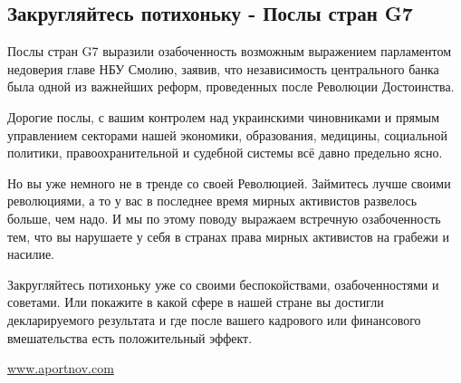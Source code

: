  
 
 
 
 
\subsection{Закругляйтесь потихоньку - Послы стран G7}

Послы стран G7 выразили озабоченность возможным выражением парламентом
недоверия главе НБУ Смолию, заявив, что независимость центрального банка была
одной из важнейших реформ, проведенных после Революции Достоинства. 

Дорогие послы, с вашим контролем над украинскими чиновниками и прямым
управлением секторами нашей экономики, образования, медицины, социальной
политики, правоохранительной и судебной системы всё давно предельно ясно. 

Но вы уже немного не в тренде со своей Революцией. Займитесь лучше своими
революциями, а то у вас в последнее время мирных активистов развелось больше,
чем надо. И мы по этому поводу выражаем встречную озабоченность тем, что вы
нарушаете у себя в странах права мирных активистов на грабежи и насилие. 

Закругляйтесь потихоньку уже со своими беспокойствами, озабоченностями и
советами. Или покажите в какой сфере в нашей стране вы достигли декларируемого
результата и где после вашего кадрового или финансового вмешательства есть
положительный эффект.

\url{www.aportnov.com}
